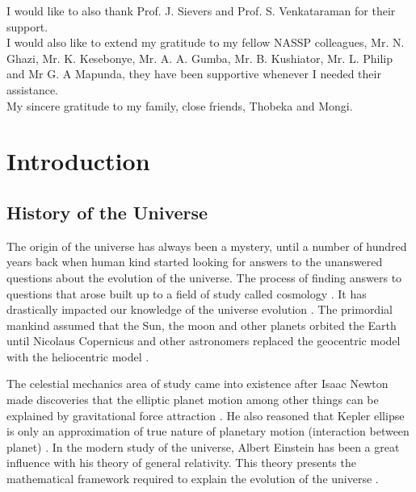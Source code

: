 \documentclass[12pt,a4paper]{report}
\begin{document}
I would like to also thank Prof. J. Sievers and Prof. S. Venkataraman for their support.\\

I would also like to extend my gratitude to my fellow NASSP colleagues, Mr. N. Ghazi, Mr. K. Kesebonye, Mr. A. A. Gumba, Mr. B. Kushiator, Mr. L. Philip and Mr G. A Mapunda, they have been supportive whenever I needed their assistance.\\ 

My sincere gratitude to my family, close friends, Thobeka and Mongi.

\newpage
\renewcommand\contentsname{Table of Contents} %
\tableofcontents\newpage %

	
	
\chapter{Introduction}
	\section{History of the Universe}
		The origin of the universe has always been a mystery, until a number of hundred years back when human kind started looking for answers to the unanswered questions about the evolution of the universe. The process of finding answers to questions that arose built up to a field of study called cosmology \cite{book:909085}. It has drastically impacted our knowledge of the universe evolution \cite{book:909085}. The primordial mankind assumed that the Sun, the moon and other planets orbited the Earth until Nicolaus Copernicus and other astronomers replaced the geocentric model with the heliocentric model \cite{2015arXiv150201967R}.
		
		The celestial mechanics area of study came into existence after Isaac Newton made discoveries that the elliptic planet motion among other things can be explained by gravitational force attraction \cite{2015arXiv150201967R}. He also reasoned that Kepler ellipse is only an approximation of true nature of planetary motion (interaction between planet) \cite{2015arXiv150201967R,2015arXiv150704654N}. In the modern study of the universe, Albert Einstein has been a great influence with his theory of general relativity. This theory presents the mathematical framework required to explain the evolution of the universe \cite{2018EPJH...43...73O}.
			
\end{document}
